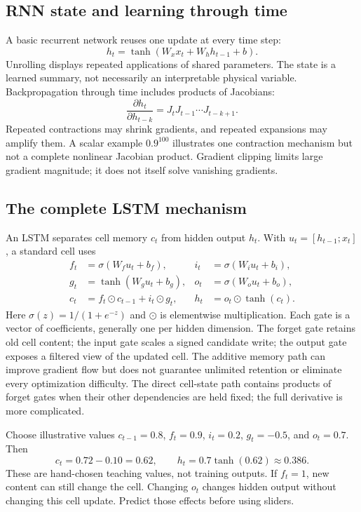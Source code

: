 \documentclass[11pt,oneside]{book}
\begin{document}
\subsection{RNN state and learning through time}
A basic recurrent network reuses one update at every time step:
\[h_t=\tanh(W_xx_t+W_hh_{t-1}+b).\]
Unrolling displays repeated applications of shared parameters. The state
is a learned summary, not necessarily an interpretable physical variable.
Backpropagation through time includes products of Jacobians:
\[\frac{\partial h_t}{\partial h_{t-k}}=J_tJ_{t-1}\cdots J_{t-k+1}.\]
Repeated contractions may shrink gradients, and repeated expansions may
amplify them. A scalar example $0.9^{100}$ illustrates one contraction
mechanism but not a complete nonlinear Jacobian product. Gradient clipping
limits large gradient magnitude; it does not itself solve vanishing gradients.

\subsection{The complete LSTM mechanism}
An LSTM separates cell memory $c_t$ from hidden output $h_t$. With
$u_t=[h_{t-1};x_t]$, a standard cell uses
\begin{align}
f_t&=\sigma(W_fu_t+b_f), & i_t&=\sigma(W_iu_t+b_i),\\
g_t&=\tanh(W_gu_t+b_g), & o_t&=\sigma(W_ou_t+b_o),\\
c_t&=f_t\odot c_{t-1}+i_t\odot g_t, &
h_t&=o_t\odot\tanh(c_t).
\end{align}
Here $\sigma(z)=1/(1+e^{-z})$ and $\odot$ is elementwise multiplication.
Each gate is a vector of coefficients, generally one per hidden dimension.
The forget gate retains old cell content; the input gate scales a signed
candidate write; the output gate exposes a filtered view of the updated cell.
The additive memory path can improve gradient flow but does not guarantee
unlimited retention or eliminate every optimization difficulty. The direct
cell-state path contains products of forget gates when their other
dependencies are held fixed; the full derivative is more complicated.

Choose illustrative values $c_{t-1}=0.8$, $f_t=0.9$, $i_t=0.2$,
$g_t=-0.5$, and $o_t=0.7$. Then
\[c_t=0.72-0.10=0.62,\qquad h_t=0.7\tanh(0.62)\approx0.386.\]
These are hand-chosen teaching values, not training outputs. If $f_t=1$,
new content can still change the cell. Changing $o_t$ changes hidden output
without changing this cell update. Predict those effects before using sliders.
\end{document}

